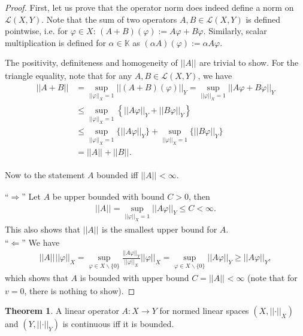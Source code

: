 \documentclass[12pt, a4paper]{article}
\numberwithin{equation}{section}
\theoremstyle{definition}
\theoremstyle{definition}
\newtheorem{theorem}[thm]{Theorem}
\newcommand{\norm}[2]{\left\vert\left\vert #1 \right\vert\right\vert_{#2}}
\begin{document}
	\begin{proof}
		First, let us prove that the operator norm does indeed define a norm on $\mathcal L(X, Y)$. Note that the sum of two operators $A, B\in\mathcal L(X, Y)$ is defined pointwise, i.e. for $\varphi\in X$: $\left(A + B\right)(\varphi) := A\varphi + B\varphi$. Similarly, scalar multiplication is defined for $\alpha \in \mathbb K$ as $\left(\alpha A\right)(\varphi) := \alpha A\varphi$.
		
		The positivity, definiteness and homogeneity of $\norm{A}{}$ are trivial to show. For the triangle equality, note that for any $A, B\in\mathcal L(X, Y)$, we have
		\begin{align}
			\norm{A + B}{} &= \sup_{\norm{\varphi}{X} = 1}\norm{\left(A + B\right)(\varphi)}{Y} = \sup_{\norm{\varphi}{X} = 1}\norm{A\varphi + B\varphi}{Y}
			\\ &\leq \sup_{\norm{\varphi}{X} = 1} \left\{\norm{A\varphi}{Y} + \norm{B\varphi}{Y}\right\} 
			\\ &\leq \sup_{\norm{\varphi}{X} = 1}\{ \norm{A\varphi}{Y} \} + \sup_{\norm{\varphi}{X} = 1}\{ \norm{B\varphi}{Y} \} 
			\\ &= \norm{A}{} + \norm{B}{}.
		\end{align}
	
		Now to the statement $A$ bounded iff $\norm{A}{} < \infty$.
		
		\enquote{$\Longrightarrow$} Let $A$ be upper bounded with bound $C > 0$, then
		\begin{align}
			\norm{A}{} = \sup_{\norm{\varphi}{X} = 1}\norm{A\varphi}{Y} \leq C < \infty.
		\end{align}
		This also shows that $\norm{A}{}$ is the smallest upper bound for $A$.
		\\
		
		\enquote{$\Longleftarrow$} We have 
		\begin{align}
			\norm{A}{} \norm{\varphi}{X} = \sup_{\varphi\in X\backslash \{0\}}\frac{\norm{A\varphi}{Y}}{\norm{\varphi}{X}} \norm{\varphi}{X} = \sup_{\varphi\in X\backslash \{0\}}\norm{A\varphi}{Y} \geq \norm{A\varphi}{Y},
		\end{align}
		which shows that $A$ is bounded with upper bound $C = \norm{A}{} < \infty$ (note that for $v = 0$, there is nothing to show).
	\end{proof}

	\begin{theorem}\label{thrm:continuous-operator-bounded}
		A linear operator $A:X\to Y$ for normed linear spaces $\left(X, \norm{\cdot}{X}\right)$ and $\left( Y, \norm{\cdot}{Y}\right)$ is continuous iff it is bounded.
	\end{theorem}
\end{document}
